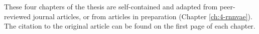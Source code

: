 These four chapters of the thesis are self-contained and adapted from peer-reviewed journal articles, or from articles in preparation (Chapter \ref{ch:4-rnnvae}). The citation to the original article can be found on the first page of each chapter.






